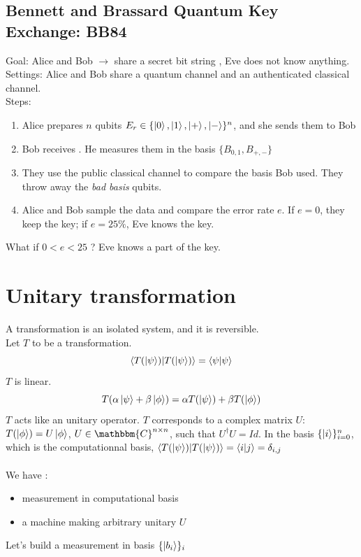 \documentclass{article}
\begin{document}
\subsection{Bennett and Brassard Quantum Key Exchange: BB84}
Goal: Alice and Bob $\rightarrow$ share a secret bit string , Eve does not know
anything. \\
Settings: Alice and Bob share a quantum channel and an authenticated classical
channel. \\\noindent Steps:
\begin{enumerate}
    \item Alice prepares $n$ qubits $E_r \in \{\ket{0}, \ket{1}, \ket{+},
    \ket{-}\}^n$, and she sends them to Bob
    \item Bob receives . He measures them in the basis $\{B_{0,1}, B_{+,-}\}$
    \item They use the public classical channel to compare the basis Bob used.
    They throw away the \textit{bad basis} qubits.
    \item Alice and Bob sample the data and compare the error rate $e$. If
        $e=0$, they keep the key; if $e = 25\%$, Eve knows the key.
\end{enumerate}
What if $0 < e < 25$ ? Eve knows a part of the key.
\section{Unitary transformation}
A transformation is an isolated system, and it is reversible. \\
Let $T$ to be a transformation.
\begin{equation}
    \braket{T(\ket{\psi})|T(\ket{\psi})}=\braket{\psi|\psi}
\end{equation}
$T$ is linear.
\begin{equation}
    T(\alpha\ket{\psi} + \beta\ket{\phi}) = \alpha T(\ket{\psi}) + \beta T(\ket{\phi})
\end{equation}
$T$ acts like an unitary operator. $T$ corresponds to a complex matrix $U$:
$T(\ket{\phi}) = U\ket{\phi}$, $U \in \mathbbm{C}^{n \times n}$, such that
$U^\dagger U= Id$.
In the basis $\{\ket{i}\}_{i=0}^n$, which is the computationnal basis,
$\braket{T(\ket{\psi})|T(\ket{\psi})} = \braket{i|j} = \delta_{i,j}$
\\
\\
We have :
\begin{itemize}[label=-]
    \item measurement in computational basis
    \item a machine making arbitrary unitary $U$
\end{itemize}
Let's build a measurement in basis $\{\ket{b_i}\}_i$
\end{document}
